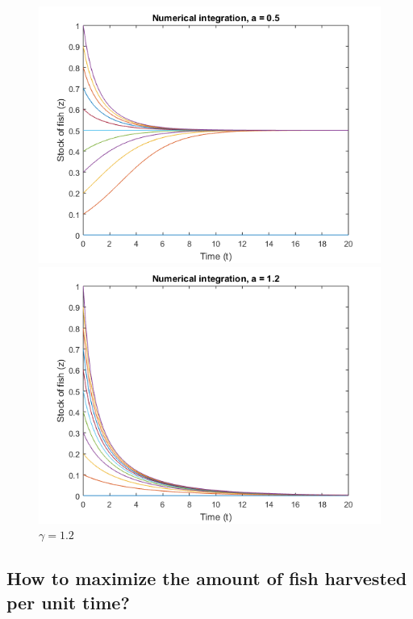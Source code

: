 \documentclass[a4paper]{article}
\begin{document}
\begin{figure}[ht]
\centering
\begin{minipage}[b]{0.45\textwidth}
\includegraphics[width=\textwidth]{Q1_ex9_0_5.png}
\caption{\(\gamma = 0.45\)}
\label{fig:0.5}
\end{minipage}
\quad
\begin{minipage}[b]{0.45\textwidth}
\includegraphics[width=\textwidth]{Q1_ex9_1_2.png}
\caption{\(\gamma = 1.2\)}
\label{fig:1.2}
\end{minipage}
\end{figure}

\subsection{How to maximize the amount of fish harvested per unit time?}
\end{document}
